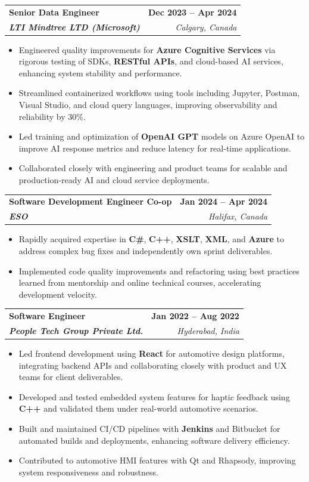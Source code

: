 \documentclass[letterpaper,11pt]{article}
\makeatletter
\newcommand{\resumeItem}[1]{
  \item\small{
    {#1 \vspace{-2pt}}
  }
}
\newcommand{\resumeSubheading}[4]{
  \vspace{-2pt}\item
    \begin{tabular*}{1.0\textwidth}[t]{l@{\extracolsep{\fill}}r}
      \textbf{#1} & \textbf{\small #2} \\
      \textit{\small#3} & \textit{\small #4} \\
    \end{tabular*}\vspace{-7pt}
}
\newcommand{\resumeItemListStart}{\begin{itemize}}
\newcommand{\resumeItemListEnd}{\end{itemize}\vspace{-5pt}}
\makeatother
\begin{document}
    \resumeSubheading
      {\textbf{Senior Data Engineer}}{\textbf{Dec 2023 -- Apr 2024}}
      {\textbf{LTI Mindtree LTD (Microsoft)}}{Calgary, Canada}
      \resumeItemListStart
        \resumeItem{Engineered quality improvements for \textbf{Azure Cognitive Services} via rigorous testing of SDKs, \textbf{RESTful APIs}, and cloud-based AI services, enhancing system stability and performance.}
        \resumeItem{Streamlined containerized workflows using tools including Jupyter, Postman, Visual Studio, and cloud query languages, improving observability and reliability by 30\%.}
        \resumeItem{Led training and optimization of \textbf{OpenAI GPT} models on Azure OpenAI to improve AI response metrics and reduce latency for real-time applications.}
        \resumeItem{Collaborated closely with engineering and product teams for scalable and production-ready AI and cloud service deployments.}
      \resumeItemListEnd
    
    \resumeSubheading
      {\textbf{Software Development Engineer Co-op}}{\textbf{Jan 2024 -- Apr 2024}}
      {\textbf{ESO}}{Halifax, Canada}
      \resumeItemListStart
        \resumeItem{Rapidly acquired expertise in \textbf{C\#}, \textbf{C++}, \textbf{XSLT}, \textbf{XML}, and \textbf{Azure} to address complex bug fixes and independently own sprint deliverables.}
        \resumeItem{Implemented code quality improvements and refactoring using best practices learned from mentorship and online technical courses, accelerating development velocity.}
      \resumeItemListEnd

    \resumeSubheading
      {\textbf{Software Engineer}}{\textbf{Jan 2022 -- Aug 2022}}
      {\textbf{People Tech Group Private Ltd.}}{Hyderabad, India}
      \resumeItemListStart
        \resumeItem{Led frontend development using \textbf{React} for automotive design platforms, integrating backend APIs and collaborating closely with product and UX teams for client deliverables.}
        \resumeItem{Developed and tested embedded system features for haptic feedback using \textbf{C++} and validated them under real-world automotive scenarios.}
        \resumeItem{Built and maintained CI/CD pipelines with \textbf{Jenkins} and Bitbucket for automated builds and deployments, enhancing software delivery efficiency.}
        \resumeItem{Contributed to automotive HMI features with Qt and Rhapsody, improving system responsiveness and robustness.}
      \resumeItemListEnd
\end{document}

